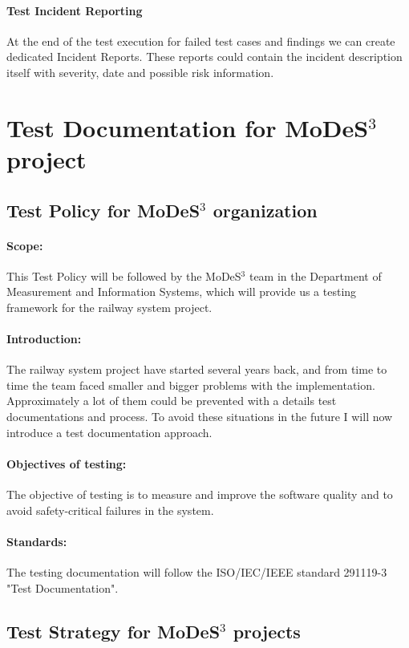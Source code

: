 \paragraph{Test Incident Reporting}
At the end of the test execution for failed test cases and findings we can create dedicated Incident Reports. These reports could contain the incident description itself with severity, date and possible risk information.


\section{Test Documentation for MoDeS$^3$ project}

\subsection{Test Policy for MoDeS$^3$ organization}
\paragraph{Scope:} This Test Policy will be followed by the MoDeS$^3$ team in the Department of Measurement and Information Systems, which will provide us a testing framework for the railway system project.
\paragraph{Introduction:} The railway system project have started several years back, and from time to time the team faced smaller and bigger problems with the implementation. Approximately a lot of them could be prevented with a details test documentations and process. To avoid these situations in the future I will now introduce a test documentation approach.
\paragraph{Objectives of testing:} The objective of testing is to measure and improve the software quality and to avoid safety-critical failures in the system.
\paragraph{Standards:} The testing documentation will follow the ISO/IEC/IEEE standard 291119-3 "Test Documentation".

\subsection{Test Strategy for MoDeS$^3$ projects}
